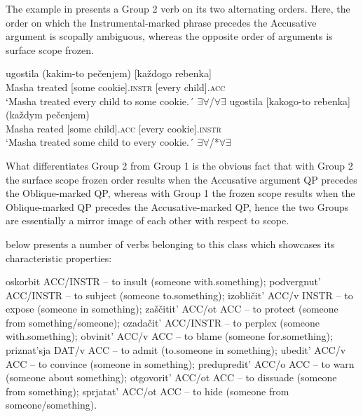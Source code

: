 \documentclass[output=paper,colorlinks,citecolor=brown,nonflat]{./langscibook}
\begin{document}
The example in  presents a Group 2 verb on its two alternating orders. Here, the order on which the Instrumental-marked phrase precedes the Accusative argument is scopally ambiguous, whereas the opposite order of arguments is surface scope frozen. 


\ea%
    \label{ex:antonyuk:15}
    \ea \label{ex:antonyuk:15a}
       {ugostila} {(kakim-to} {pečenjem)}  {[každogo} {rebenka]}\\
    Masha treated  [some        cookie].\textsc{instr} [every child].\textsc{acc}\\
    \glt `Masha treated every child to some cookie.´ \hfill ${\exists}{\forall}$/${\forall}{\exists}$
    \ex \label{ex:antonyuk:15b}
       {ugostila} {[kakogo-to} {rebenka]}    {(každym} {pečenjem)}\\
    Masha reated    [some child].\textsc{acc} [every    cookie].\textsc{instr}\\
    \glt `Masha treated some child to every cookie.´ \hfill ${\exists}{\forall}$/*${\forall}{\exists}$
    \z
\z

What differentiates Group 2 from Group 1 is the obvious fact that with Group 2 the surface scope frozen order results when the Accusative argument QP precedes the Oblique-marked QP, whereas with Group 1 the frozen scope results when the Oblique-marked QP precedes the Accusative-marked QP, hence the two Groups are essentially a mirror image of each other with respect to scope.

 below presents a number of verbs belonging to this class which showcases its characteristic properties:

\ea%
    \label{ex:antonyuk:16}
    \ea \label{ex:antonyuk:16a}
    oskorbit ACC/INSTR – to insult (someone with.something);
    \ex \label{ex:antonyuk:16b}
    podvergnut’ ACC/INSTR – to subject (someone to.something);
    \ex \label{ex:antonyuk:16c}
    izobličit’ ACC/v INSTR – to expose (someone in something);
    \ex \label{ex:antonyuk:16d}
    zaščitit’ ACC/ot ACC – to protect (someone from something/someone);
    \ex \label{ex:antonyuk:16e}
    ozadačit’ ACC/INSTR – to perplex (someone with.something);
    \ex \label{ex:antonyuk:16f}
    obvinit’ ACC/v ACC – to blame (someone for.something);
    \ex \label{ex:antonyuk:16g}
    priznat’sja DAT/v ACC – to admit (to.someone in something);
    \ex \label{ex:antonyuk:16h}
    ubedit’ ACC/v ACC – to convince (someone in something);
    \ex \label{ex:antonyuk:16i}
    predupredit’ ACC/o ACC – to warn (someone about something);
    \ex \label{ex:antonyuk:16j}
    otgovorit’ ACC/ot ACC – to dissuade (someone from something);
    \ex \label{ex:antonyuk:16k}
    sprjatat’ ACC/ot ACC – to hide (someone from someone/something).
    \z
\z
\end{document}
